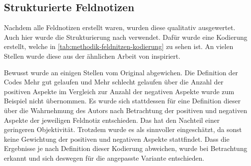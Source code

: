 \subsection{Strukturierte Feldnotizen}
\label{sec:methodik-auswertung-feldnotizen}

Nachdem alle Feldnotizen erstellt waren, wurden diese qualitativ ausgewertet.
Auch hier wurde die Strukturierung nach  verwendet.
Dafür wurde eine Kodierung erstellt, welche in \cref{tab:methodik-feldnitzen-kodierung} zu sehen ist.
An vielen Stellen wurde diese aus der ähnlichen Arbeit von  inspiriert.



Bewusst wurde an einigen Stellen vom Original abgewichen.
Die Definition der Codes \glqq Mehr gut gelaufen\grqq{} und \glqq Mehr schlecht gelaufen\grqq{} über die Anzahl der positiven Aspekte im Vergleich zur Anzahl der negativen Aspekte wurde zum Beispiel nicht übernommen.
Es wurde sich stattdessen für eine Definition dieser über die Wahrnehmung des Autors nach Betrachtung der positiven und negativen Aspekte der jeweiligen Feldnotiz entschieden.
Das hat den Nachteil einer geringeren Objektivität.
Trotzdem wurde es als sinnvoller eingeschätzt, da sonst keine Gewichtung der positiven und negativen Aspekte stattfindet.
Dass die Ergebnisse je nach Definition dieser Kodierung abweichen, wurde bei Betrachtung erkannt und sich deswegen für die angepasste Variante entschieden.

